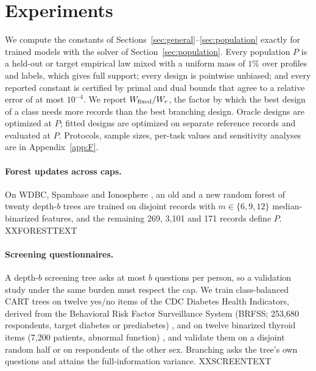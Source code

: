 \section{Experiments}\label{sec:experiments}
We compute the constants of Sections~\ref{sec:general}--\ref{sec:population} exactly for trained models with the solver of Section~\ref{sec:population}. Every population $P$ is a held-out or target empirical law mixed with a uniform mass of $1\%$ over profiles and labels, which gives full support; every design is pointwise unbiased; and every reported constant is certified by primal and dual bounds that agree to a relative error of at most $10^{-4}$. We report $W_{\rm fixed}/W_r$, the factor by which the best design of a class needs more records than the best branching design. Oracle designs are optimized at $P$; fitted designs are optimized on separate reference records and evaluated at $P$. Protocols, sample sizes, per-task values and sensitivity analyses are in Appendix~\ref{app:F}.

\paragraph{Forest updates across caps.}
On WDBC, Spambase and Ionosphere \citep{wolberg1993,spambase1999,ionosphere1989}, an old and a new random forest of twenty depth-$b$ trees are trained on disjoint records with $m\in\{6,9,12\}$ median-binarized features, and the remaining 269, 3,101 and 171 records define $P$. XXFORESTTEXT



\paragraph{Screening questionnaires.}
A depth-$b$ screening tree asks at most $b$ questions per person, so a validation study under the same burden must respect the cap. We train class-balanced CART trees on twelve yes/no items of the CDC Diabetes Health Indicators, derived from the Behavioral Risk Factor Surveillance System (BRFSS; 253,680 respondents, target diabetes or prediabetes) \citep{cdcdiabetes2017}, and on twelve binarized thyroid items (7,200 patients, abnormal function) \citep{quinlan1986thyroid}, and validate them on a disjoint random half or on respondents of the other sex. Branching asks the tree's own questions and attains the full-information variance. XXSCREENTEXT



